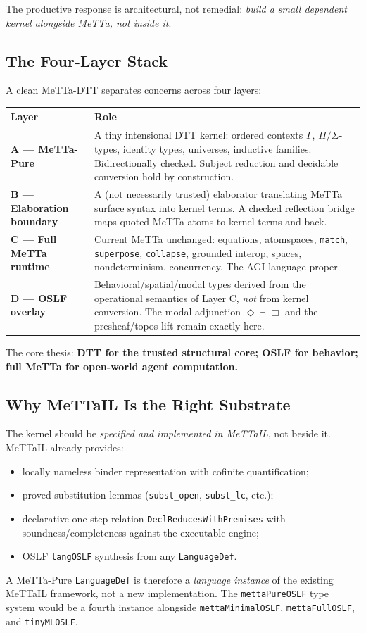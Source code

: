 \documentclass[11pt]{article}
\newcommand{\code}[1]{\texttt{#1}}
\begin{document}
The productive response is architectural, not remedial: \emph{build a small
dependent kernel alongside MeTTa, not inside it}.

\subsection{The Four-Layer Stack}

A clean MeTTa-DTT separates concerns across four layers:

\medskip
\begin{tabular}{lp{9cm}}
\toprule
Layer & Role \\
\midrule
\textbf{A — MeTTa-Pure} &
  A tiny intensional DTT kernel: ordered contexts $\Gamma$, $\Pi/\Sigma$-types,
  identity types, universes, inductive families. Bidirectionally checked.
  Subject reduction and decidable conversion hold by construction. \\[4pt]
\textbf{B — Elaboration boundary} &
  A (not necessarily trusted) elaborator translating MeTTa surface syntax into
  kernel terms. A checked reflection bridge maps quoted MeTTa atoms to kernel
  terms and back. \\[4pt]
\textbf{C — Full MeTTa runtime} &
  Current MeTTa unchanged: equations, atomspaces, \code{match},
  \code{superpose}, \code{collapse}, grounded interop, spaces,
  nondeterminism, concurrency. The AGI language proper. \\[4pt]
\textbf{D — OSLF overlay} &
  Behavioral/spatial/modal types derived from the operational semantics of
  Layer C, \emph{not} from kernel conversion. The modal adjunction
  $\Diamond \dashv \Box$ and the presheaf/topos lift remain exactly here. \\
\bottomrule
\end{tabular}
\medskip

The core thesis: \textbf{DTT for the trusted structural core; OSLF for
behavior; full MeTTa for open-world agent computation.}

\subsection{Why MeTTaIL Is the Right Substrate}

The kernel should be \emph{specified and implemented in MeTTaIL}, not beside it.
MeTTaIL already provides:
\begin{itemize}
  \item locally nameless binder representation with cofinite quantification;
  \item proved substitution lemmas (\code{subst\_open}, \code{subst\_lc}, etc.);
  \item declarative one-step relation \code{DeclReducesWithPremises} with
        soundness/completeness against the executable engine;
  \item OSLF \code{langOSLF} synthesis from any \code{LanguageDef}.
\end{itemize}
A MeTTa-Pure \code{LanguageDef} is therefore a \emph{language instance} of
the existing MeTTaIL framework, not a new implementation. The
\code{mettaPureOSLF} type system would be a fourth instance alongside
\code{mettaMinimalOSLF}, \code{mettaFullOSLF}, and \code{tinyMLOSLF}.
\end{document}
